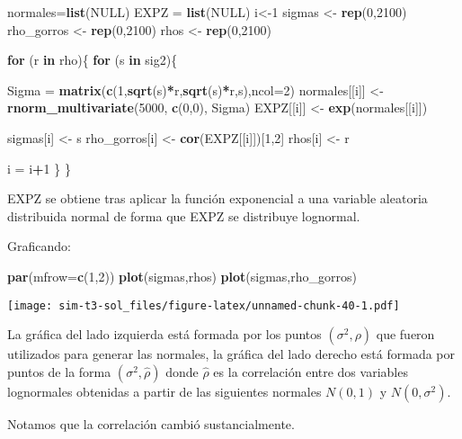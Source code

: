 \documentclass[]{article}
\newenvironment{Shaded}{\begin{snugshade}}{\end{snugshade}}
\newcommand{\ControlFlowTok}[1]{\textcolor[rgb]{0.13,0.29,0.53}{\textbf{#1}}}
\newcommand{\DataTypeTok}[1]{\textcolor[rgb]{0.13,0.29,0.53}{#1}}
\newcommand{\DecValTok}[1]{\textcolor[rgb]{0.00,0.00,0.81}{#1}}
\newcommand{\KeywordTok}[1]{\textcolor[rgb]{0.13,0.29,0.53}{\textbf{#1}}}
\newcommand{\NormalTok}[1]{#1}
\newcommand{\OperatorTok}[1]{\textcolor[rgb]{0.81,0.36,0.00}{\textbf{#1}}}
\newcommand{\OtherTok}[1]{\textcolor[rgb]{0.56,0.35,0.01}{#1}}
\newcommand{\StringTok}[1]{\textcolor[rgb]{0.31,0.60,0.02}{#1}}
\begin{document}
\begin{Shaded}
\begin{Highlighting}[]
\NormalTok{normales=}\KeywordTok{list}\NormalTok{(}\OtherTok{NULL}\NormalTok{)}
\NormalTok{EXPZ =}\StringTok{ }\KeywordTok{list}\NormalTok{(}\OtherTok{NULL}\NormalTok{)}
\NormalTok{i<-}\DecValTok{1}
\NormalTok{sigmas <-}\StringTok{ }\KeywordTok{rep}\NormalTok{(}\DecValTok{0}\NormalTok{,}\DecValTok{2100}\NormalTok{)}
\NormalTok{rho_gorros <-}\StringTok{ }\KeywordTok{rep}\NormalTok{(}\DecValTok{0}\NormalTok{,}\DecValTok{2100}\NormalTok{)}
\NormalTok{rhos <-}\StringTok{ }\KeywordTok{rep}\NormalTok{(}\DecValTok{0}\NormalTok{,}\DecValTok{2100}\NormalTok{)}

\ControlFlowTok{for}\NormalTok{ (r }\ControlFlowTok{in}\NormalTok{ rho)\{}
  \ControlFlowTok{for}\NormalTok{ (s }\ControlFlowTok{in}\NormalTok{ sig2)\{}
    
\NormalTok{    Sigma =}\StringTok{ }\KeywordTok{matrix}\NormalTok{(}\KeywordTok{c}\NormalTok{(}\DecValTok{1}\NormalTok{,}\KeywordTok{sqrt}\NormalTok{(s)}\OperatorTok{*}\NormalTok{r,}\KeywordTok{sqrt}\NormalTok{(s)}\OperatorTok{*}\NormalTok{r,s),}\DataTypeTok{ncol=}\DecValTok{2}\NormalTok{)}
\NormalTok{    normales[[i]] <-}\StringTok{ }\KeywordTok{rnorm_multivariate}\NormalTok{(}\DecValTok{5000}\NormalTok{, }\KeywordTok{c}\NormalTok{(}\DecValTok{0}\NormalTok{,}\DecValTok{0}\NormalTok{), Sigma)}
\NormalTok{    EXPZ[[i]] <-}\StringTok{ }\KeywordTok{exp}\NormalTok{(normales[[i]])}
    
\NormalTok{    sigmas[i] <-}\StringTok{ }\NormalTok{s}
\NormalTok{    rho_gorros[i] <-}\StringTok{ }\KeywordTok{cor}\NormalTok{(EXPZ[[i]])[}\DecValTok{1}\NormalTok{,}\DecValTok{2}\NormalTok{]}
\NormalTok{    rhos[i] <-}\StringTok{ }\NormalTok{r}
    
\NormalTok{    i =}\StringTok{ }\NormalTok{i}\OperatorTok{+}\DecValTok{1}
\NormalTok{  \}}
\NormalTok{\}}
\end{Highlighting}
\end{Shaded}

EXPZ se obtiene tras aplicar la función exponencial a una variable
aleatoria distribuida normal de forma que EXPZ se distribuye lognormal.

Graficando:

\begin{Shaded}
\begin{Highlighting}[]
\KeywordTok{par}\NormalTok{(}\DataTypeTok{mfrow=}\KeywordTok{c}\NormalTok{(}\DecValTok{1}\NormalTok{,}\DecValTok{2}\NormalTok{))}
\KeywordTok{plot}\NormalTok{(sigmas,rhos)}
\KeywordTok{plot}\NormalTok{(sigmas,rho_gorros)}
\end{Highlighting}
\end{Shaded}

\texttt{[image: sim-t3-sol\_files/figure-latex/unnamed-chunk-40-1.pdf]}

La gráfica del lado izquierda está formada por los puntos
\((\sigma^2, \rho)\) que fueron utilizados para generar las normales, la
gráfica del lado derecho está formada por puntos de la forma
\((\sigma^2, \hat{\rho})\) donde \(\hat{\rho}\) es la correlación entre
dos variables lognormales obtenidas a partir de las siguientes normales
\(N(0,1)\) y \(N(0,\sigma^2)\).

Notamos que la correlación cambió sustancialmente.
\end{document}

